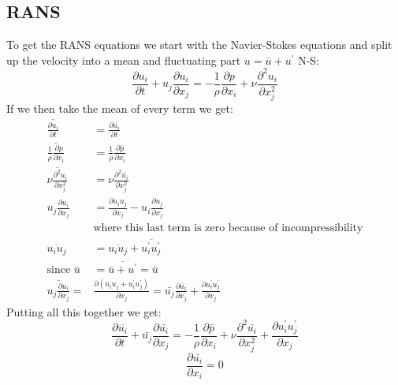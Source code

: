 \documentclass[a4paper,norsk]{article}
\begin{document}
\subsection*{RANS}
To get the RANS equations we start with the Navier-Stokes equations and split up the velocity into a mean and fluctuating part $ u = \bar{u} + u^{'} $
N-S:
\begin{equation}
 \frac{\partial u_i}{\partial t} + u_j \frac{\partial u_i}{\partial x_j} = - \frac{1}{\rho} \frac{\partial p}{\partial x_i} + \nu \frac{\partial^2 u_i}{\partial x_j^2}    
\end{equation}
If we then take the mean of every term we get:
\begin{align*}
\overline{\frac{\partial u_i}{\partial t}} &= \frac{\partial \overline{u_i}}{\partial t}\\
\overline{\frac{1}{\rho} \frac{\partial p}{\partial x_i}} &= \frac{1}{\rho} \frac{\partial \bar{p}}{\partial x_i} \\
\overline{\nu \frac{\partial^2 u_i}{\partial x_j^2}} &= \nu \frac{\partial^2 \bar{u_i}}{\partial x_j^2}  \\
u_j \frac{\partial u_i}{\partial x_j} &= \frac{\partial u_iu_j}{\partial x_j} - u_i \frac{\partial u_j}{\partial x_j}\\
& \text{where this last term is zero because of incompressibility}\\
\overline{u_i u_j} & = \overline{u_i u_j} + \overline {u_i^{'}u_j^{'}} \\
\text{since  } \bar{u} &= \overline{\bar{u}+u^{'}} = \bar{u}\\
\overline{u_j \frac{\partial u_i}{\partial x_j}} =& \frac{\partial (\overline{u_iu_j} + u_i^{'}u_j^{'})}{\partial x_j} = \bar{u_j} \frac{\partial \bar{u_i}}{\partial x_j} + \frac{\partial u_i^{'} u_j^{'}}{\partial x_j}
\end{align*}
Putting all this together we get:
\begin{equation}
\frac{\partial \overline{u_i}}{\partial t} +\bar{u_j} \frac{\partial \bar{u_i}}{\partial x_j}  =- \frac{1}{\rho} \frac{\partial \bar{p}}{\partial x_i}+  \nu \frac{\partial^2 \bar{u_i}}{\partial x_j^2} + \frac{\partial u_i^{'} u_j^{'}}{\partial x_j}
\end{equation}
$$ \frac{\partial \bar{u_i}}{\partial x_i} = 0 $$
\end{document}
